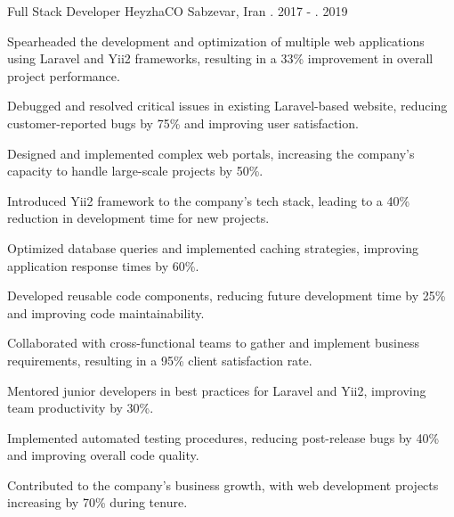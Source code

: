 \begin{cventries}
  \cventry
    {Full Stack Developer} %
    {HeyzhaCO} %
    {Sabzevar, Iran} %
    {\shortmonthname[09]. 2017 - \shortmonthname[01]. 2019} %
    {
      \begin{cvitems} %
        \item {Spearheaded the development and optimization of multiple web applications using Laravel and Yii2 frameworks, resulting in a 33\% improvement in overall project performance.}
        \item {Debugged and resolved critical issues in existing Laravel-based website, reducing customer-reported bugs by 75\% and improving user satisfaction.}
        \item {Designed and implemented complex web portals, increasing the company's capacity to handle large-scale projects by 50\%.}
        \item {Introduced Yii2 framework to the company's tech stack, leading to a 40\% reduction in development time for new projects.}
        \item {Optimized database queries and implemented caching strategies, improving application response times by 60\%.}
        \item {Developed reusable code components, reducing future development time by 25\% and improving code maintainability.}
        \item{Collaborated with cross-functional teams to gather and implement business requirements, resulting in a 95\% client satisfaction rate.}
        \item{Mentored junior developers in best practices for Laravel and Yii2, improving team productivity by 30\%.}
        \item{Implemented automated testing procedures, reducing post-release bugs by 40\% and improving overall code quality.}
        \item{Contributed to the company's business growth, with web development projects increasing by 70\% during tenure.}
      \end{cvitems}
    }
    
    
    

\end{cventries}
